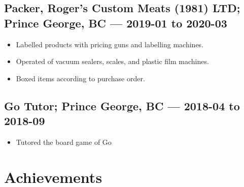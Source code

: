 \documentclass{article}
\begin{document}

\subsection*{Packer, Roger's Custom Meats (1981) LTD; Prince George, BC — 2019-01 to 2020-03}

\begin{itemize}
	\item Labelled products with pricing guns and labelling machines.
	\item Operated of vacuum sealers, scales, and plastic film machines.
	\item Boxed items according to purchase order.
\end{itemize}

\subsection*{Go Tutor; Prince George, BC — 2018-04 to 2018-09}

\begin{itemize}
	\item Tutored the board game of Go
\end{itemize}

\section*{Achievements}
\end{document}
